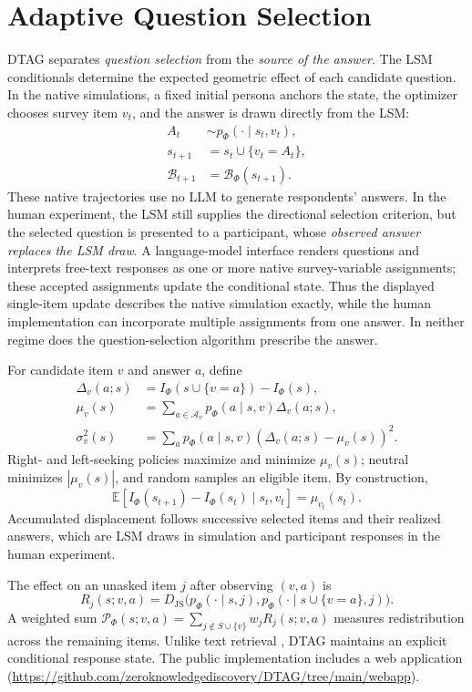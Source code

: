 \documentclass[technote,10pt]{IEEEtran}
\newcommand{\EE}{\mathbb{E}}
\newcommand{\calB}{\mathcal{B}}
\newcommand{\JS}{D_{\mathrm{JS}}}
\newcommand{\Ph}{\Phi}
\begin{document}
\section{Adaptive Question Selection}
DTAG separates \emph{question selection} from the \emph{source of the answer}. The LSM conditionals determine the expected geometric effect of each candidate question. In the native simulations, a fixed initial persona anchors the state, the optimizer chooses survey item $v_t$, and the answer is drawn directly from the LSM:
\begin{align}
A_t&\sim p_\Ph(\cdot\mid s_t,v_t),\label{eq:draw}\\
s_{t+1}&=s_t\cup\{v_t=A_t\},\label{eq:update}\\
\calB_{t+1}&=\calB_\Ph(s_{t+1}).\label{eq:posterior}
\end{align}
These native trajectories use no LLM to generate respondents' answers. In the human experiment, the LSM still supplies the directional selection criterion, but the selected question is presented to a participant, whose \emph{observed answer replaces the LSM draw}. A language-model interface renders questions and interprets free-text responses as one or more native survey-variable assignments; these accepted assignments update the conditional state. Thus the displayed single-item update describes the native simulation exactly, while the human implementation can incorporate multiple assignments from one answer. In neither regime does the question-selection algorithm prescribe the answer.

For candidate item $v$ and answer $a$, define
\begin{align}
\Delta_v(a;s)&=I_\Ph(s\cup\{v=a\})-I_\Ph(s),\label{eq:delta}\\
\mu_v(s)&=\sum_{a\in\mathcal A_v}p_\Ph(a\mid s,v)\Delta_v(a;s),\label{eq:mu}\\
\sigma_v^2(s)&=\sum_a p_\Ph(a\mid s,v)(\Delta_v(a;s)-\mu_v(s))^2.
\label{eq:var}
\end{align}
Right- and left-seeking policies maximize and minimize $\mu_v(s)$; neutral minimizes $|\mu_v(s)|$, and random samples an eligible item. By construction,
\begin{equation*}
\EE[I_\Ph(s_{t+1})-I_\Ph(s_t)\mid s_t,v_t]=\mu_{v_t}(s_t).
\end{equation*}
Accumulated displacement follows successive selected items and their realized answers, which are LSM draws in simulation and participant responses in the human experiment.

The effect on an unasked item $j$ after observing $(v,a)$ is
\begin{equation}
R_j(s;v,a)=\JS\!\bigl(p_\Ph(\cdot\mid s,j),
p_\Ph(\cdot\mid s\cup\{v=a\},j)\bigr).
\label{eq:ripple}
\end{equation}
A weighted sum $\mathcal P_\Ph(s;v,a)=\sum_{j\notin S\cup\{v\}}w_jR_j(s;v,a)$ measures redistribution across the remaining items. Unlike text retrieval \cite{lewis2020}, DTAG maintains an explicit conditional response state. The public implementation includes a web application (\url{https://github.com/zeroknowledgediscovery/DTAG/tree/main/webapp}).
\end{document}
